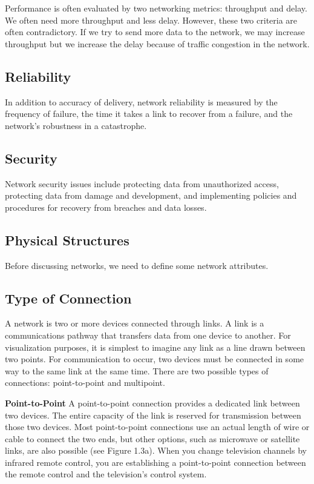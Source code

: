 Performance is often evaluated by two networking metrics: throughput and delay. We often need more throughput and less delay. However, these two criteria are often contradictory. If we try to send more data to the network, we may increase throughput but we increase the delay because of traffic congestion in the network.

\subsection*{Reliability}
In addition to accuracy of delivery, network reliability is measured by the frequency of failure, the time it takes a link to recover from a failure, and the network's robustness in a catastrophe.

\subsection*{Security}
Network security issues include protecting data from unauthorized access, protecting data from damage and development, and implementing policies and procedures for recovery from breaches and data losses.

\subsection{Physical Structures}
Before discussing networks, we need to define some network attributes.

\subsection*{Type of Connection}
A network is two or more devices connected through links. A link is a communications pathway that transfers data from one device to another. For visualization purposes, it is simplest to imagine any link as a line drawn between two points. For communication to occur, two devices must be connected in some way to the same link at the same time. There are two possible types of connections: point-to-point and multipoint.

\textbf{Point-to-Point} A point-to-point connection provides a dedicated link between two devices. The entire capacity of the link is reserved for transmission between those two devices. Most point-to-point connections use an actual length of wire or cable to connect the two ends, but other options, such as microwave or satellite links, are also possible (see Figure 1.3a). When you change television channels by infrared remote control, you are establishing a point-to-point connection between the remote control and the television's control system.

